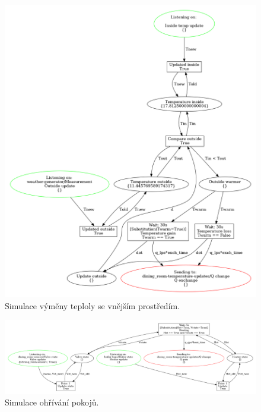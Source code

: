 \begin{figure}[htb]
  \centering
  \includegraphics[width=\textwidth]{obrazky-figures/room-exchange.png}
  \caption{Simulace výměny teploly se vnějším prostředím.}
  \label{exchange-viz}
\end{figure}

\begin{figure}
  \centering
  \includegraphics[width=\textwidth]{obrazky-figures/room-heating.png}
  \caption{Simulace ohřívání pokojů.}
  \label{heater-viz}
\end{figure}


